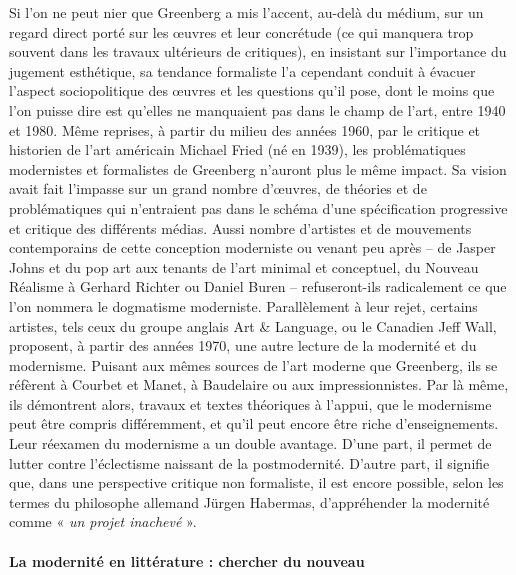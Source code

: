 Si l'on ne peut nier que Greenberg a mis l'accent, au-delà du médium, sur un regard direct porté sur les œuvres et leur concrétude (ce qui manquera trop souvent dans les travaux ultérieurs de critiques), en insistant sur l'importance du jugement esthétique, sa tendance formaliste l'a cependant conduit à évacuer l'aspect sociopolitique des œuvres et les questions qu'il pose, dont le moins que l'on puisse dire est qu'elles ne manquaient pas dans le champ de l'art, entre 1940 et 1980.
Même reprises, à partir du milieu des années 1960, par le critique et historien de l'art américain Michael Fried (né en 1939), les problématiques modernistes et formalistes de Greenberg n'auront plus le même impact. Sa vision avait fait l'impasse sur un grand nombre d'œuvres, de théories et de problématiques qui n'entraient pas dans le schéma d'une spécification progressive et critique des différents médias. Aussi nombre d'artistes et de mouvements contemporains de cette conception moderniste ou venant peu après – de Jasper Johns et du pop art aux tenants de l'art minimal et conceptuel, du Nouveau Réalisme à Gerhard Richter ou Daniel Buren – refuseront-ils radicalement ce que l'on nommera le dogmatisme moderniste.
Parallèlement à leur rejet, certains artistes, tels ceux du groupe anglais Art \& Language, ou le Canadien Jeff Wall, proposent, à partir des années 1970, une autre lecture de la modernité et du modernisme. Puisant aux mêmes sources de l'art moderne que Greenberg, ils se réfèrent à Courbet et Manet, à Baudelaire ou aux impressionnistes. Par là même, ils démontrent alors, travaux et textes théoriques à l'appui, que le modernisme peut être compris différemment, et qu'il peut encore être riche d'enseignements. Leur réexamen du modernisme a un double avantage. D'une part, il permet de lutter contre l'éclectisme naissant de la postmodernité. D'autre part, il signifie que, dans une perspective critique non formaliste, il est encore possible, selon les termes du philosophe allemand Jürgen Habermas, d'appréhender la modernité comme « \textit{un projet inachevé }».

\paragraph{La modernité en littérature : chercher du nouveau}


